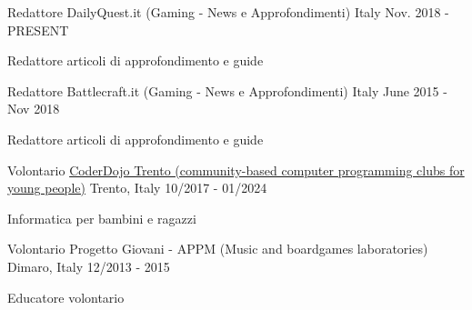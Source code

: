 

\begin{cventries}

  \cventry
    {Redattore} %
    {DailyQuest.it (Gaming - News e Approfondimenti)} %
    {Italy} %
    {Nov. 2018 - PRESENT} %
    {
      \begin{cvitems} %
        \item {Redattore articoli di approfondimento e guide}
      \end{cvitems}
    }

  \cventry
    {Redattore} %
    {Battlecraft.it (Gaming - News e Approfondimenti)} %
    {Italy} %
    {June 2015 - Nov 2018} %
    {
      \begin{cvitems} %
        \item {Redattore articoli di approfondimento e guide}
      \end{cvitems}
    }

  \cventry
    {Volontario} %
    {\href{https://www.coderdojotrento.it/}{CoderDojo Trento (community-based computer programming clubs for young people)}} %
    {Trento, Italy} %
    {10/2017 - 01/2024} %
    {
      \begin{cvitems} %
        \item {Informatica per bambini e ragazzi}
      \end{cvitems}
    }

  \cventry
    {Volontario} %
    {Progetto Giovani - APPM (Music and boardgames laboratories)} %
    {Dimaro, Italy} %
    {12/2013 - 2015} %
    {
      \begin{cvitems} %
        \item {Educatore volontario}
      \end{cvitems}
    }

\end{cventries}